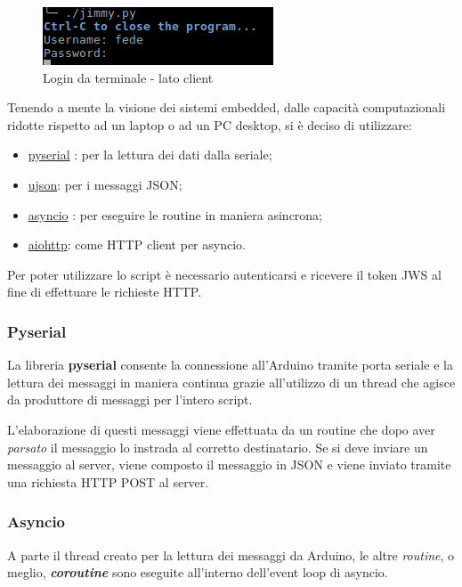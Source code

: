 \begin{figure}[!ht]
	\centering
	\includegraphics[scale=.8]{img/py.png}
	\caption{Login da terminale - lato client}\label{img:pythonTerminale}
\end{figure}

Tenendo a mente la visione dei sistemi embedded, dalle capacità computazionali ridotte rispetto ad un laptop o ad un PC desktop, si è deciso di utilizzare:
\begin{itemize}
	\item \href{https://github.com/pyserial/pyserial}{pyserial} : per la lettura dei dati dalla seriale;
	\item \href{https://github.com/pyserial/pyserial}{ujson}: per i messaggi JSON;
	\item \href{https://github.com/python/asyncio}{asyncio} : per eseguire le routine in maniera asincrona;
	\item \href{https://github.com/KeepSafe/aiohttp}{aiohttp}: come HTTP client per asyncio.
\end{itemize}
Per poter utilizzare lo script è necessario autenticarsi e ricevere il token JWS al fine di effettuare le richieste HTTP.

\subsubsection{Pyserial}
La libreria \textbf{pyserial} consente la connessione all'Arduino tramite porta seriale e la lettura dei messaggi in maniera continua grazie all'utilizzo di un thread che agisce da produttore di messaggi per l'intero script.

L'elaborazione di questi messaggi viene effettuata da un routine che dopo aver \textit{parsato} il messaggio lo instrada al corretto destinatario. Se si deve inviare un messaggio al server, viene composto il messaggio in JSON e viene inviato tramite una richiesta HTTP POST al server.

\subsubsection{Asyncio}
A parte il thread creato per la lettura dei messaggi da Arduino, le altre \textit{routine}, o meglio, \textit{\textbf{coroutine}} sono eseguite all'interno dell'event loop di asyncio. 

